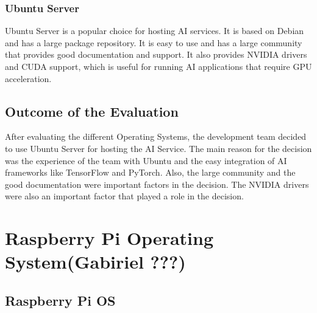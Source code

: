 \cite{LinuxForServerRedhead}

\subsubsection{Ubuntu Server}

Ubuntu Server is a popular choice for hosting AI services. It is based on Debian and has a large package repository. It is easy to use and has a large community that provides good documentation and support. It also provides NVIDIA drivers and CUDA support, which is useful for running AI applications that require GPU acceleration.

\cite{LinuxForServerUbuntu} 

\subsection {Outcome of the Evaluation}

After evaluating the different Operating Systems, the development team decided to use Ubuntu Server for hosting the AI Service.
The main reason for the decision was the experience of the team with Ubuntu and the easy integration of AI frameworks like TensorFlow and PyTorch.
Also, the large community and the good documentation were important factors in the decision. The NVIDIA drivers were also an important factor that played a role in the decision.


\section{Raspberry Pi Operating System(Gabiriel ???)}

\subsection{Raspberry Pi OS}


\author{Florian Prandstetter}
